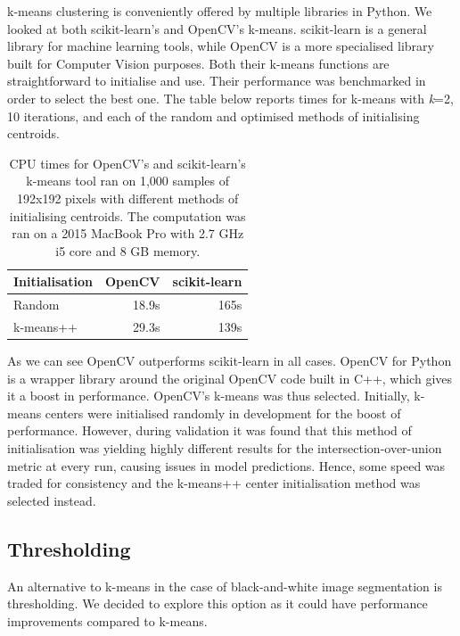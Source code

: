 k-means clustering is conveniently offered by multiple libraries in Python. We looked at both scikit-learn's and OpenCV's k-means. scikit-learn is a general library  for machine learning tools, while OpenCV is a more specialised library built for Computer Vision purposes. Both their k-means functions are straightforward to initialise and use. Their performance was benchmarked in order to select the best one. The table below reports times for k-means with \textit{k}=2, 10 iterations, and each of the random and optimised methods of initialising centroids.

\begin{table}[h]
\centering
\caption{CPU times for OpenCV's and scikit-learn's k-means tool ran on 1,000 samples of 192x192 pixels with different methods of initialising centroids.  The computation was ran on a 2015 MacBook Pro with 2.7 GHz i5 core and 8 GB memory.}
\begin{tabular}{|l|l|l|}
\hline
\rowcolor[HTML]{EFEFEF}
\textbf{Initialisation} & \textbf{OpenCV} & \textbf{scikit-learn} \\ \hline
Random                                   & \multicolumn{1}{r|}{18.9s}       & \multicolumn{1}{r|}{165s}              \\
k-means++                                & \multicolumn{1}{r|}{29.3s}       & \multicolumn{1}{r|}{139s}              \\ \hline
\end{tabular}
\end{table}

As we can see OpenCV outperforms scikit-learn in all cases. OpenCV for Python is a wrapper library around the original OpenCV code built in C++, which gives it a boost in performance. OpenCV's k-means was thus selected. Initially, k-means centers were initialised randomly in development for the boost of performance. However, during validation it was found that this method of initialisation was yielding highly different results for the intersection-over-union metric at every run, causing issues in model predictions. Hence, some speed was traded for consistency and the k-means++ center initialisation method was selected instead.

\subsection{Thresholding}

An alternative to k-means in the case of black-and-white image segmentation is thresholding. We decided to explore this option as it could have performance improvements compared to k-means.

